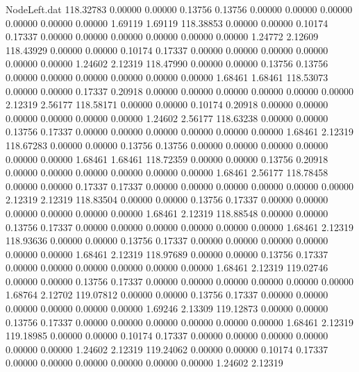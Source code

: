 \begin{filecontents}{NodeLeft.dat}
 118.32783    0.00000    0.00000     0.13756    0.13756    0.00000    0.00000    0.00000    0.00000    0.00000    0.00000    1.69119    1.69119
 118.38853    0.00000    0.00000     0.10174    0.17337    0.00000    0.00000    0.00000    0.00000    0.00000    0.00000    1.24772    2.12609
 118.43929    0.00000    0.00000     0.10174    0.17337    0.00000    0.00000    0.00000    0.00000    0.00000    0.00000    1.24602    2.12319
 118.47990    0.00000    0.00000     0.13756    0.13756    0.00000    0.00000    0.00000    0.00000    0.00000    0.00000    1.68461    1.68461
 118.53073    0.00000    0.00000     0.17337    0.20918    0.00000    0.00000    0.00000    0.00000    0.00000    0.00000    2.12319    2.56177
 118.58171    0.00000    0.00000     0.10174    0.20918    0.00000    0.00000    0.00000    0.00000    0.00000    0.00000    1.24602    2.56177
 118.63238    0.00000    0.00000     0.13756    0.17337    0.00000    0.00000    0.00000    0.00000    0.00000    0.00000    1.68461    2.12319
 118.67283    0.00000    0.00000     0.13756    0.13756    0.00000    0.00000    0.00000    0.00000    0.00000    0.00000    1.68461    1.68461
 118.72359    0.00000    0.00000     0.13756    0.20918    0.00000    0.00000    0.00000    0.00000    0.00000    0.00000    1.68461    2.56177
 118.78458    0.00000    0.00000     0.17337    0.17337    0.00000    0.00000    0.00000    0.00000    0.00000    0.00000    2.12319    2.12319
 118.83504    0.00000    0.00000     0.13756    0.17337    0.00000    0.00000    0.00000    0.00000    0.00000    0.00000    1.68461    2.12319
 118.88548    0.00000    0.00000     0.13756    0.17337    0.00000    0.00000    0.00000    0.00000    0.00000    0.00000    1.68461    2.12319
 118.93636    0.00000    0.00000     0.13756    0.17337    0.00000    0.00000    0.00000    0.00000    0.00000    0.00000    1.68461    2.12319
 118.97689    0.00000    0.00000     0.13756    0.17337    0.00000    0.00000    0.00000    0.00000    0.00000    0.00000    1.68461    2.12319
 119.02746    0.00000    0.00000     0.13756    0.17337    0.00000    0.00000    0.00000    0.00000    0.00000    0.00000    1.68764    2.12702
 119.07812    0.00000    0.00000     0.13756    0.17337    0.00000    0.00000    0.00000    0.00000    0.00000    0.00000    1.69246    2.13309
 119.12873    0.00000    0.00000     0.13756    0.17337    0.00000    0.00000    0.00000    0.00000    0.00000    0.00000    1.68461    2.12319
 119.18985    0.00000    0.00000     0.10174    0.17337    0.00000    0.00000    0.00000    0.00000    0.00000    0.00000    1.24602    2.12319
 119.24062    0.00000    0.00000     0.10174    0.17337    0.00000    0.00000    0.00000    0.00000    0.00000    0.00000    1.24602    2.12319

\end{filecontents}
